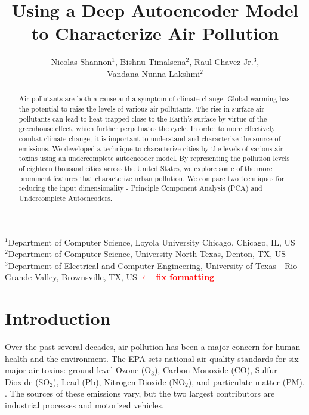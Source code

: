 \documentclass{article}
\title{Using a Deep Autoencoder Model to Characterize Air Pollution}
\author{Nicolas Shannon$^{1}$, Bishnu Timalsena$^{2}$, Raul Chavez Jr.$^{3}$, \\Vandana Nunna Lakshmi$^{2}$}
\date{}
\newcommand\note[1]{\textbf{\textcolor{red}{#1}}}
\begin{document}
\begin{centering}
\maketitle
\vspace{-0.50cm}
\scriptsize
{$^{1}$Department of Computer Science, Loyola University Chicago, Chicago, IL, US}\\
{$^{2}$Department of Computer Science, University North Texas, Denton, TX, US}\\
{$^{3}$Department of Electrical and Computer Engineering, University of Texas 
    - Rio Grande Valley, Brownsville, TX, US \note{$\leftarrow$ fix formatting}}
\end{centering}

\begin{abstract}
Air pollutants are both a cause and a symptom of climate change. Global warming has the potential to raise
the levels of various air pollutants. The rise in surface air pollutants can lead to heat trapped close to 
the Earth's surface by virtue of the greenhouse effect, which further perpetuates the cycle. In order to
more effectively combat climate change, it is important to understand and characterize the source of 
emissions. We developed a technique to characterize cities by the levels of various air toxins using an
undercomplete autoencoder model. By representing the pollution levels of eighteen thousand cities across
the United States, we explore some of the more prominent features that characterize urban pollution.
We compare two techniques for reducing the input dimensionality - Principle Component Analysis (PCA) and
Undercomplete Autoencoders.
\end{abstract}

\vspace{0.25cm}
\section{Introduction}
Over the past several decades, air pollution has been a major concern for human health
and the environment. The EPA sets national air quality standards for  six major air
toxins: ground level Ozone (O$_3$), Carbon Monoxide (CO), Sulfur Dioxide (SO$_2$),
Lead (Pb), Nitrogen Dioxide (NO$_2$), and particulate matter (PM). \parencite{NAAQS09}.
The sources of these emissions vary, but the two largest contributors are industrial 
processes and motorized vehicles.

\newpage
\end{document}
